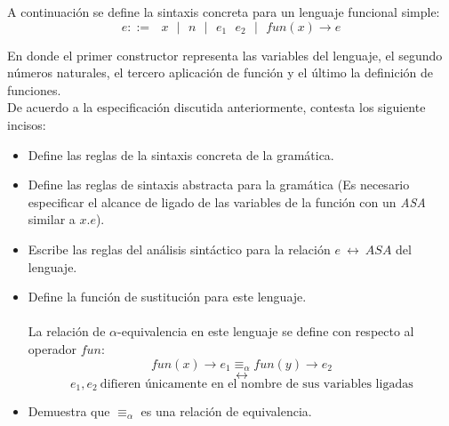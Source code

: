    \begin{exercise}
        A continuación se define la sintaxis concreta para un lenguaje funcional simple:
        \[ e ::=  \text{ $x$ } \text{$|$} \text{ $n$  }\text{$|$} \text{ } e_1 \text{ } e_2 \text{ } \text{$|$} \text{ } fun(x) \rightarrow e \]

    En donde el primer constructor representa las variables del lenguaje, el segundo números naturales,
    el tercero aplicación de función y el último la definición de funciones.\\

    De acuerdo a la especificación discutida anteriormente, contesta los siguiente incisos: \\
    \begin{itemize}
        \item Define las reglas de la sintaxis concreta de la gramática.
        \item Define las reglas de sintaxis abstracta para la gramática (Es necesario especificar el alcance de ligado de las variables de la función con un \textit{ASA} similar a $x.e$).
        \item Escribe las reglas del análisis sintáctico  para la relación $e \ \longleftrightarrow\ ASA$ del lenguaje.
        \item Define la función de sustitución para este lenguaje. \\\\
        La relación de $\alpha$-equivalencia en este lenguaje se define con respecto al operador $fun$:
             \[ fun(x) \rightarrow e_1 \equiv_\alpha fun(y) \rightarrow e_2   \]
	  \[  \longleftrightarrow  \]
	  \[e_1, e_2 \  \text{difieren únicamente en el nombre de sus variables ligadas}\]
             \item Demuestra que $\equiv_\alpha$ es una relación de equivalencia.
    \end{itemize}

   \end{exercise}
    